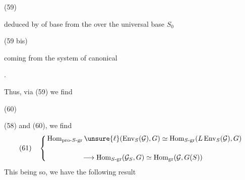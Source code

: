 \begin{samepage}
(59)\quad
{}
\end{samepage}
deduced by  of base from the  over the universal base $S_0$

\begin{samepage}
(59 bis)\quad
{}
\end{samepage}
coming from the system of canonical 



.

Thus, via (59) we find

\begin{samepage}
(60)\quad
{}
\end{samepage}


 (58) and (60), we find
\[
(61)\quad\left\{
\begin{aligned}
&\operatorname{Hom}_{\mathrm{pro}\text{-}S\text{-}\mathrm{gr}}\unsure{\ell}
 (\operatorname{Env}_S(\mathcal{G}),G)
 \simeq\operatorname{Hom}_{S\text{-}\mathrm{gr}}(L\operatorname{Env}_S(\mathcal{G}),G)\\[1.2em]
&\hspace{5em}\longrightarrow\operatorname{Hom}_{S\text{-}\mathrm{gr}}(\mathcal{G}_S,G)
 \simeq\operatorname{Hom}_{\mathrm{gr}}(\mathcal{G},G(S))
\end{aligned}\right.
\]
This being so, we have the following result

